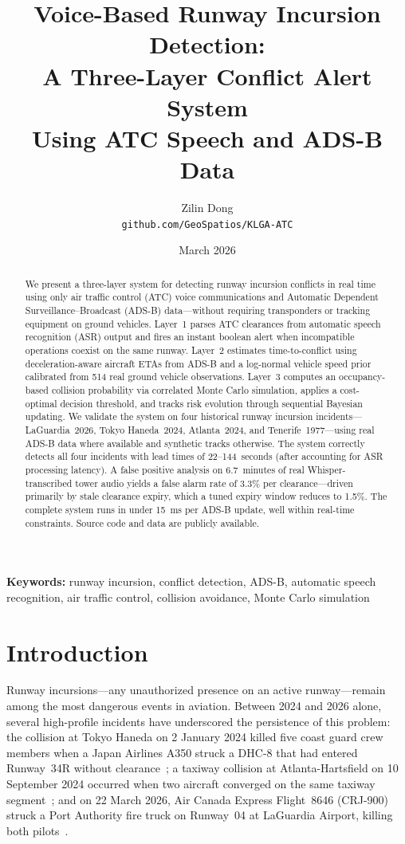 \documentclass[11pt,a4paper]{article}
\title{Voice-Based Runway Incursion Detection:\\A Three-Layer Conflict Alert System\\Using ATC Speech and ADS-B Data}
\author{
    Zilin Dong \\
    \texttt{github.com/GeoSpatios/KLGA-ATC}
}
\date{March 2026}
\begin{document}
\maketitle

\begin{abstract}
We present a three-layer system for detecting runway incursion conflicts in real time using only air traffic control (ATC) voice communications and Automatic Dependent Surveillance--Broadcast (ADS-B) data---without requiring transponders or tracking equipment on ground vehicles.
Layer~1 parses ATC clearances from automatic speech recognition (ASR) output and fires an instant boolean alert when incompatible operations coexist on the same runway.
Layer~2 estimates time-to-conflict using deceleration-aware aircraft ETAs from ADS-B and a log-normal vehicle speed prior calibrated from 514 real ground vehicle observations.
Layer~3 computes an occupancy-based collision probability via correlated Monte Carlo simulation, applies a cost-optimal decision threshold, and tracks risk evolution through sequential Bayesian updating.
We validate the system on four historical runway incursion incidents---LaGuardia~2026, Tokyo Haneda~2024, Atlanta~2024, and Tenerife~1977---using real ADS-B data where available and synthetic tracks otherwise.
The system correctly detects all four incidents with lead times of 22--144~seconds (after accounting for ASR processing latency).
A false positive analysis on 6.7~minutes of real Whisper-transcribed tower audio yields a false alarm rate of 3.3\% per clearance---driven primarily by stale clearance expiry, which a tuned expiry window reduces to 1.5\%.
The complete system runs in under 15~ms per ADS-B update, well within real-time constraints.
Source code and data are publicly available.
\end{abstract}

\noindent\textbf{Keywords:} runway incursion, conflict detection, ADS-B, automatic speech recognition, air traffic control, collision avoidance, Monte Carlo simulation

\section{Introduction}
\label{sec:intro}

Runway incursions---any unauthorized presence on an active runway---remain among the most dangerous events in aviation.
Between 2024 and 2026 alone, several high-profile incidents have underscored the persistence of this problem: the collision at Tokyo Haneda on 2 January 2024 killed five coast guard crew members when a Japan Airlines A350 struck a DHC-8 that had entered Runway~34R without clearance~\citep{jtsb2024haneda}; a taxiway collision at Atlanta-Hartsfield on 10 September 2024 occurred when two aircraft converged on the same taxiway segment~\citep{ntsb2024katl}; and on 22 March 2026, Air Canada Express Flight~8646 (CRJ-900) struck a Port Authority fire truck on Runway~04 at LaGuardia Airport, killing both pilots~\citep{ntsb2026lga}.
\end{document}
